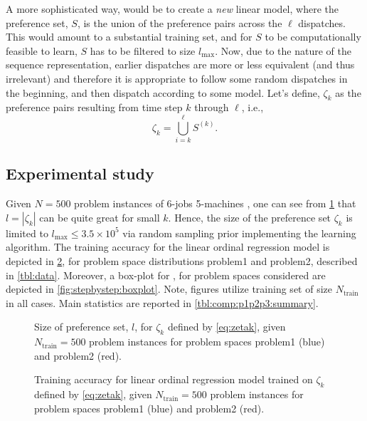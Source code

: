 A more sophisticated way, would be to create a \emph{new} linear model, where the preference set, $S$, is the union of the preference pairs across the $\ell$ dispatches. This would amount to a substantial training set, and for $S$ to be computationally feasible to learn, $S$ has to be filtered to size $l_{\max}$.
Now, due to the nature of the sequence representation, earlier dispatches are more or less equivalent (and thus irrelevant) and therefore it is appropriate to follow some random dispatches in the beginning, and then dispatch according to some model. Let's define, $\zeta_k$ as the preference pairs resulting from time step $k$ through $\ell$, i.e., 
\begin{equation}
\zeta_k=\bigcup_{i=k}^{\ell} S^{(k)} \label{eq:zetak}.
\end{equation}

\subsection{Experimental study}\label{sec:global}
Given $N=500$ problem instances of 6-jobs 5-machines \jsp, one can see from \cref{fig:global:sizeofprefset} that $l=|\zeta_k|$ can be quite great for small $k$. Hence, the size of the preference set $\zeta_k$ is limited to $l_{\max}\leq 3.5\times10^{5}$ via random sampling prior implementing the learning algorithm. The training accuracy for the linear ordinal regression model is depicted in \cref{fig:global:tracc}, for problem space distributions problem{1} and problem{2}, described in \cref{tbl:data}.
Moreover, a box-plot for \fullnamerho, for problem spaces considered are depicted in  \cref{fig:stepbystep:boxplot}. Note, figures utilize training set of size $N_{\text{train}}$ in all cases. Main statistics are reported in \cref{tbl:comp:p1p2p3:summary}. 

\begin{figure}\centering 
\caption{Size of preference set, $l$, for $\zeta_k$ defined by \cref{eq:zetak}, given $N_{\text{train}}=500$ problem instances for problem spaces problem{1} (blue) and problem{2} (red).}
\label{fig:global:sizeofprefset}
\end{figure}

\begin{figure}\centering
\caption{Training accuracy for linear ordinal regression model trained on $\zeta_k$ defined by \cref{eq:zetak}, given $N_{\text{train}}=500$ problem instances for problem spaces problem{1} (blue) and problem{2} (red).}
\label{fig:global:tracc}
\end{figure}

